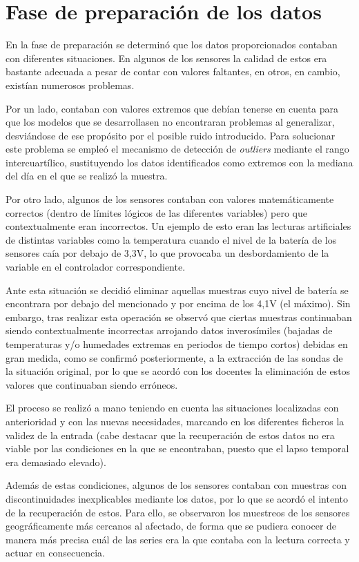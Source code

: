 \section{Fase de preparación de los datos}
En la fase de preparación se determinó que los datos proporcionados contaban con diferentes situaciones. En algunos
de los sensores la calidad de estos era bastante adecuada a pesar de contar con valores faltantes, en otros, en cambio,
existían numerosos problemas.

Por un lado, contaban con valores extremos que debían tenerse en cuenta para que los modelos que se desarrollasen no 
encontraran problemas al generalizar, desviándose de ese propósito por el posible ruido introducido.
Para solucionar este problema se empleó el mecanismo de detección de \textit{outliers} mediante el rango intercuartílico,
sustituyendo los datos identificados como extremos con la mediana del día en el que se realizó la muestra.

Por otro lado, algunos de los sensores contaban con valores matemáticamente correctos (dentro de límites lógicos de las 
diferentes variables) pero que contextualmente eran incorrectos. Un ejemplo de esto eran las lecturas artificiales de 
distintas variables como la temperatura cuando el nivel de la batería de los sensores caía por debajo de 3,3V, lo que
provocaba un desbordamiento de la variable en el controlador correspondiente.

Ante esta situación se decidió eliminar aquellas muestras cuyo nivel de batería se encontrara por debajo del mencionado
y por encima de los 4,1V (el máximo). Sin embargo, tras realizar esta operación se observó que ciertas 
muestras continuaban siendo contextualmente incorrectas arrojando datos inverosímiles (bajadas de temperaturas y/o 
humedades extremas en periodos de tiempo cortos) debidas en gran medida, como se confirmó posteriormente, 
a la extracción de las sondas de la situación original, por lo que se acordó con los docentes la eliminación de estos 
valores que continuaban siendo erróneos.

El proceso se realizó a mano teniendo en cuenta las situaciones localizadas con anterioridad y con las nuevas necesidades,
marcando en los diferentes ficheros la validez de la entrada (cabe destacar que la recuperación de estos datos no era viable 
por las condiciones en la que se encontraban, puesto que el lapso temporal era demasiado elevado).

Además de estas condiciones, algunos de los sensores contaban con muestras con discontinuidades inexplicables 
mediante los datos, por lo que se acordó el intento de la recuperación de estos. Para ello, se observaron los muestreos
de los sensores geográficamente más cercanos al afectado, de forma que se pudiera conocer de manera más 
precisa cuál de las series era la que contaba con la lectura correcta y actuar en consecuencia.

